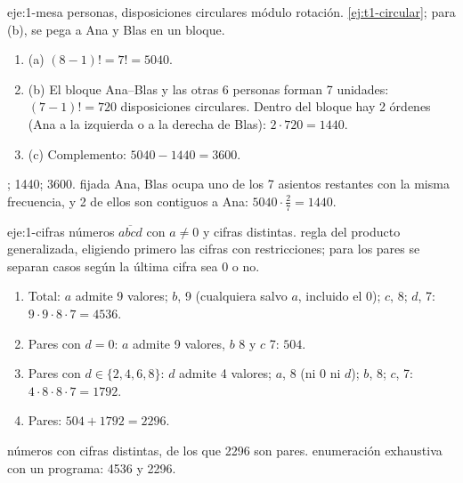 \begin{solucion}{eje:1-mesa}
 personas, disposiciones circulares módulo rotación.
\planteamiento \cref{ej:t1-circular}; para (b), se pega a Ana y Blas en un bloque.
\pasos
\begin{enumerate}[label=\arabic*.]
  \item (a) $(8-1)!=7!=5040$.
  \item (b) El bloque Ana--Blas y las otras 6 personas forman 7 unidades: $(7-1)!=720$ disposiciones circulares. Dentro del bloque hay 2 órdenes (Ana a la izquierda o a la derecha de Blas): $2\cdot720=1440$.
  \item (c) Complemento: $5040-1440=3600$.
\end{enumerate}
; 1440; 3600.
\comprobacion fijada Ana, Blas ocupa uno de los 7 asientos restantes con la misma frecuencia, y 2 de ellos son contiguos a Ana: $5040\cdot\frac27=1440$.
\end{solucion}

\begin{solucion}{eje:1-cifras}
\datos números $\overline{abcd}$ con $a\neq0$ y cifras distintas.
\planteamiento regla del producto generalizada, eligiendo primero las cifras con restricciones; para los pares se separan casos según la última cifra sea 0 o no.
\pasos
\begin{enumerate}[label=\arabic*.]
  \item Total: $a$ admite 9 valores; $b$, 9 (cualquiera salvo $a$, incluido el 0); $c$, 8; $d$, 7: $9\cdot9\cdot8\cdot7=4536$.
  \item Pares con $d=0$: $a$ admite 9 valores, $b$ 8 y $c$ 7: $504$.
  \item Pares con $d\in\{2,4,6,8\}$: $d$ admite 4 valores; $a$, 8 (ni 0 ni $d$); $b$, 8; $c$, 7: $4\cdot8\cdot8\cdot7=1792$.
  \item Pares: $504+1792=2296$.
\end{enumerate}
 números con cifras distintas, de los que 2296 son pares.
\comprobacion enumeración exhaustiva con un programa: 4536 y 2296.
\end{solucion}

